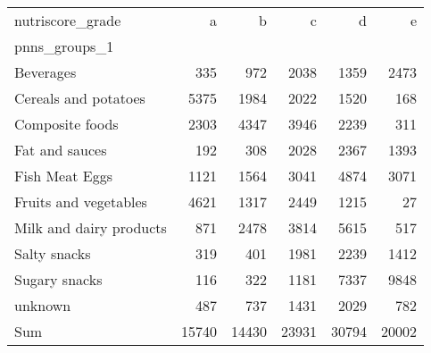 \begin{tabular}{lrrrrr}
\toprule
nutriscore\_grade &      a &      b &      c &      d &      e \\
pnns\_groups\_1           &        &        &        &        &        \\
\midrule
Beverages               &    335 &    972 &   2038 &   1359 &   2473 \\
Cereals and potatoes    &   5375 &   1984 &   2022 &   1520 &    168 \\
Composite foods         &   2303 &   4347 &   3946 &   2239 &    311 \\
Fat and sauces          &    192 &    308 &   2028 &   2367 &   1393 \\
Fish Meat Eggs          &   1121 &   1564 &   3041 &   4874 &   3071 \\
Fruits and vegetables   &   4621 &   1317 &   2449 &   1215 &     27 \\
Milk and dairy products &    871 &   2478 &   3814 &   5615 &    517 \\
Salty snacks            &    319 &    401 &   1981 &   2239 &   1412 \\
Sugary snacks           &    116 &    322 &   1181 &   7337 &   9848 \\
unknown                 &    487 &    737 &   1431 &   2029 &    782 \\
Sum                     &  15740 &  14430 &  23931 &  30794 &  20002 \\
\bottomrule
\end{tabular}
